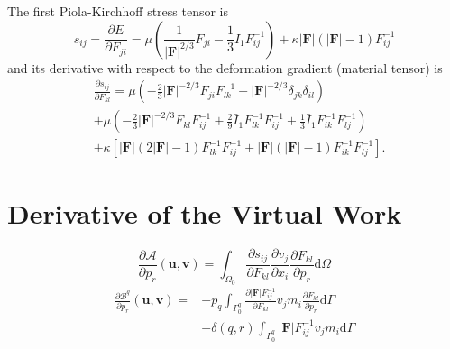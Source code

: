 \documentclass[journal]{IEEEtran}
\theoremstyle{definition}
\begin{document}
The first Piola-Kirchhoff stress tensor is
\begin{equation}
  s_{ij} = \frac{\partial E}{\partial F_{ji}} = \mu\left(\frac{1}{\left|\mathbf{F}\right|^{2/3}}F_{ji} - \frac{1}{3} \bar{I}_1 F_{ij}^{-1}\right) + \kappa \left|\mathbf{F}\right|\left(\left|\mathbf{F}\right| - 1\right)F_{ij}^{-1}
  \label{eq:stress_tensor}
\end{equation}
and its derivative with respect to the deformation gradient (material tensor) is
\begin{equation}
  \begin{split}
    &\frac{\partial s_{ij}}{\partial F_{kl}} = \mu\left(
      -\frac{2}{3}\left|\mathbf{F}\right|^{-2/3}F_{ji}F_{lk}^{-1} + \left|\mathbf{F}\right|^{-2/3}\delta_{jk}\delta_{il}
    \right) \\
    &+ \mu\left(
      -\frac{2}{3} \left|\mathbf{F}\right|^{-2/3}F_{kl}F_{ij}^{-1} + \frac{2}{9} \bar{I}_1 F_{lk}^{-1}F_{ij}^{-1} + \frac{1}{3} \bar{I}_1 F_{ik}^{-1}F_{lj}^{-1}
    \right) \\
    &+ \kappa\left[
      \left|\mathbf{F}\right|\left(2\left|\mathbf{F}\right| - 1\right)F_{lk}^{-1}F_{ij}^{-1} + \left|\mathbf{F}\right|\left(\left|\mathbf{F}\right| - 1\right)F_{ik}^{-1}F_{lj}^{-1}
    \right].
  \end{split}
\end{equation}

\section{Derivative of the Virtual Work}
\label{sec:derivative_results}

\begin{equation}
  \frac{\partial \mathcal{A}}{\partial p_r}(\mathbf{u}, \mathbf{v}) = \int_{\Omega_0} \frac{\partial s_{ij}}{\partial F_{kl}} \frac{\partial v_j}{\partial x_i}\frac{\partial F_{kl}}{\partial p_r} \mathrm{d}\Omega
  \label{eq:derivative_A}
\end{equation}
\begin{equation}
\begin{split}
  \frac{\partial \mathcal{B}^q}{\partial p_r}(\mathbf{u}, \mathbf{v}) = &- p_q\int_{\Gamma_0^q} 
  \frac{\partial \left|\mathbf{F}\right|F_{ij}^{-1}}{\partial F_{kl}}  v_j m_i
  \frac{\partial F_{kl}}{\partial p_r} \mathrm{d}\Gamma \\
  &- \delta \left(q, r\right) \int_{\Gamma^q_0} \left|\mathbf{F}\right|F_{ij}^{-1} v_j m_i \mathrm{d}\Gamma \\
\end{split}
\label{eq:derivative_Bp}
\end{equation}
\end{document}
